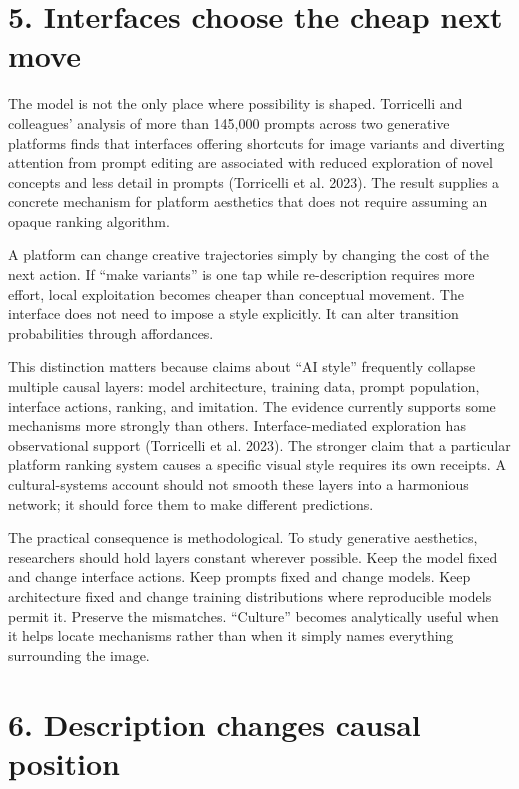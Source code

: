 \documentclass[
  11pt,
  letterpaper,
]{article}
\begin{document}
\section{5. Interfaces choose the cheap next
move}\label{interfaces-choose-the-cheap-next-move}

The model is not the only place where possibility is shaped. Torricelli
and colleagues' analysis of more than 145,000 prompts across two
generative platforms finds that interfaces offering shortcuts for image
variants and diverting attention from prompt editing are associated with
reduced exploration of novel concepts and less detail in prompts
(Torricelli et al. 2023). The result supplies a concrete mechanism for
platform aesthetics that does not require assuming an opaque ranking
algorithm.

A platform can change creative trajectories simply by changing the cost
of the next action. If ``make variants'' is one tap while re-description
requires more effort, local exploitation becomes cheaper than conceptual
movement. The interface does not need to impose a style explicitly. It
can alter transition probabilities through affordances.

This distinction matters because claims about ``AI style'' frequently
collapse multiple causal layers: model architecture, training data,
prompt population, interface actions, ranking, and imitation. The
evidence currently supports some mechanisms more strongly than others.
Interface-mediated exploration has observational support (Torricelli et
al. 2023). The stronger claim that a particular platform ranking system
causes a specific visual style requires its own receipts. A
cultural-systems account should not smooth these layers into a
harmonious network; it should force them to make different predictions.

The practical consequence is methodological. To study generative
aesthetics, researchers should hold layers constant wherever possible.
Keep the model fixed and change interface actions. Keep prompts fixed
and change models. Keep architecture fixed and change training
distributions where reproducible models permit it. Preserve the
mismatches. ``Culture'' becomes analytically useful when it helps locate
mechanisms rather than when it simply names everything surrounding the
image.

\section{6. Description changes causal
position}\label{description-changes-causal-position}
\end{document}
